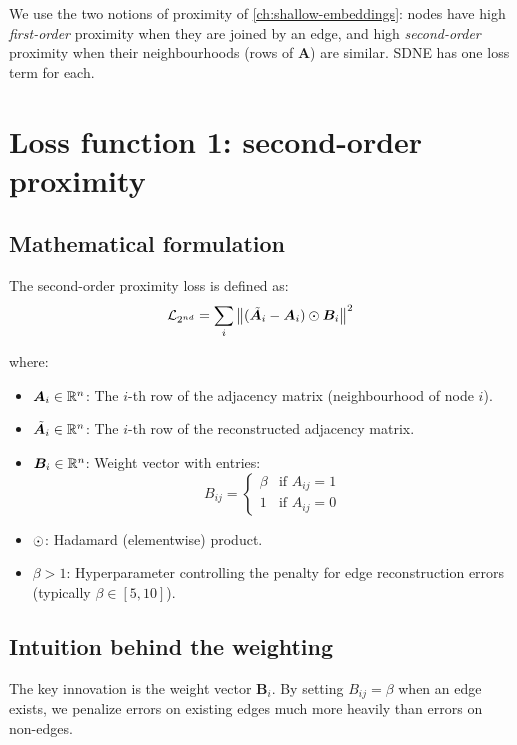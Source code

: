 \begin{notechapter}
We use the two notions of proximity of \cref{ch:shallow-embeddings}: nodes have high \emph{first-order} proximity when they are joined by an edge, and high \emph{second-order} proximity when their neighbourhoods (rows of $\bm A$) are similar. SDNE has one loss term for each.

\section{Loss function 1: second-order proximity}

\subsection{Mathematical formulation}

The second-order proximity loss is defined as:
\begin{equation}
\mathcal{L}_{2^{nd}} = \sum_{i} \left\|(\tilde{\bm{A}}_i - \bm{A}_i) \odot \bm{B}_i\right\|^2
\label{graph-autoencoders:eq:l2_loss}
\end{equation}

where:
\begin{itemize}
    \item $\bm{A}_i \in \mathbb{R}^n$: The $i$-th row of the adjacency matrix (neighbourhood of node $i$).
    \item $\tilde{\bm{A}}_i \in \mathbb{R}^n$: The $i$-th row of the reconstructed adjacency matrix.
    \item $\bm{B}_i \in \mathbb{R}^n$: Weight vector with entries:
    \begin{equation}
    B_{ij} = \begin{cases}
    \beta & \text{if } A_{ij} = 1 \\
    1 & \text{if } A_{ij} = 0
    \end{cases}
    \end{equation}
    \item $\odot$: Hadamard (elementwise) product.
    \item $\beta > 1$: Hyperparameter controlling the penalty for edge reconstruction errors (typically $\beta \in [5, 10]$).
\end{itemize}

\subsection{Intuition behind the weighting}

The key innovation is the weight vector $\bm{B}_i$. By setting $B_{ij} = \beta$ when an edge exists, we penalize errors on existing edges much more heavily than errors on non-edges.


\end{notechapter}

